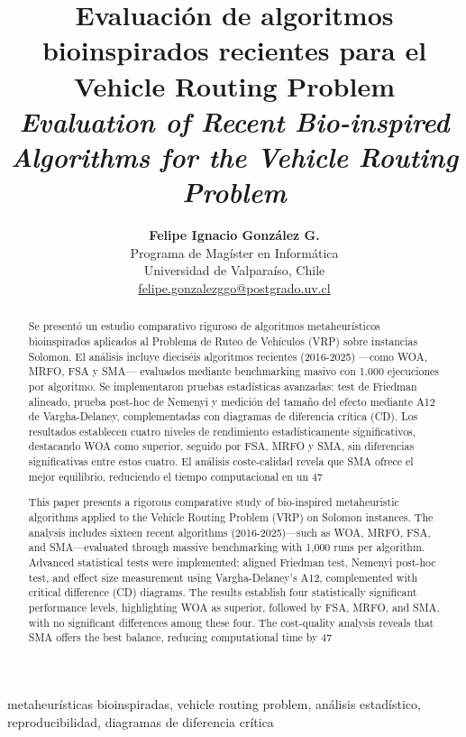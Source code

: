\documentclass[conference,a4paper]{IEEEtran}
\title{Evaluación de algoritmos bioinspirados recientes para el Vehicle Routing Problem
\\ \textit{Evaluation of Recent Bio-inspired Algorithms for the Vehicle Routing Problem}}
\author{%
  \begin{tabular}{c}
    \textbf{Felipe Ignacio González G.}\\
    Programa de Magíster en Informática\\
    Universidad de Valparaíso, Chile\\
    \href{mailto:felipe.gonzalezggo@postgrado.uv.cl}{felipe.gonzalezggo@postgrado.uv.cl}
  \end{tabular}}
\begin{document}
\maketitle

\begin{abstract}
Se presentó un estudio comparativo riguroso de algoritmos metaheurísticos bioinspirados aplicados al Problema de Ruteo de Vehículos (VRP) sobre instancias Solomon. El análisis incluye dieciséis algoritmos recientes (2016-2025) —como WOA, MRFO, FSA y SMA— evaluados mediante benchmarking masivo con 1.000 ejecuciones por algoritmo. Se implementaron pruebas estadísticas avanzadas: test de Friedman alineado, prueba post-hoc de Nemenyi y medición del tamaño del efecto mediante A12 de Vargha-Delaney, complementadas con diagramas de diferencia crítica (CD). Los resultados establecen cuatro niveles de rendimiento estadísticamente significativos, destacando WOA como superior, seguido por FSA, MRFO y SMA, sin diferencias significativas entre estos cuatro. El análisis coste-calidad revela que SMA ofrece el mejor equilibrio, reduciendo el tiempo computacional en un 47 %
\end{abstract}

\begin{IEEEkeywords}
metaheurísticas bioinspiradas, vehicle routing problem, análisis estadístico, reproducibilidad, diagramas de diferencia crítica
\end{IEEEkeywords}

\begin{abstract}
This paper presents a rigorous comparative study of bio-inspired metaheuristic algorithms applied to the Vehicle Routing Problem (VRP) on Solomon instances. The analysis includes sixteen recent algorithms (2016-2025)—such as WOA, MRFO, FSA, and SMA—evaluated through massive benchmarking with 1,000 runs per algorithm. Advanced statistical tests were implemented: aligned Friedman test, Nemenyi post-hoc test, and effect size measurement using Vargha-Delaney's A12, complemented with critical difference (CD) diagrams. The results establish four statistically significant performance levels, highlighting WOA as superior, followed by FSA, MRFO, and SMA, with no significant differences among these four. The cost-quality analysis reveals that SMA offers the best balance, reducing computational time by 47 %
\end{abstract}
\end{document}
